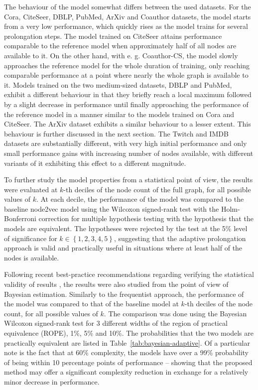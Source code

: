 The behaviour of the model somewhat differs between the used datasets. For the Cora, CiteSeer, DBLP, PubMed, ArXiv and Coauthor datasets, the model starts from a very low performance, which quickly rises as the model trains for several prolongation steps. The model trained on CiteSeer attains performance comparable to the reference model when approximately half of all nodes are available to it. On the other hand, with e. g. Coauthor-CS, the model slowly approaches the reference model for the whole duration of training, only reaching comparable performance at a point where nearly the whole graph is available to it. Models trained on the two medium-sized datasets, DBLP and PubMed, exhibit a different behaviour in that they briefly reach a local maximum followed by a slight decrease in performance until finally approaching the performance of the reference model in a manner similar to the models trained on Cora and CiteSeer. The ArXiv dataset exhibits a similar behaviour to a lesser extent. This behaviour is further discussed in the next section. The Twitch and IMDB datasets are substantially different, with very high initial performance and only small performance gains with increasing number of nodes available, with different variants of it exhibiting this effect to a different magnitude.

To further study the model properties from a statistical point of view, the results were evaluated at \( k \)-th deciles of the node count of the full graph, for all possible values of \( k \). At each decile, the performance of the model was compared to the baseline node2vec model using the Wilcoxon signed-rank test with the Holm-Bonferroni correction for multiple hypothesis testing with the hypothesis that the models are equivalent. The hypotheses were rejected by the test at the 5\% level of significance for \( k \in \left\{ 1, 2, 3, 4, 5 \right\} \), suggesting that the adaptive prolongation approach is valid and practically useful in situations where at least half of the nodes is available.

Following recent best-practice recommendations regarding verifying the statistical validity of results \cite{benavoli_time_2017}, the results were also studied from the point of view of Bayesian estimation. Similarly to the frequentist approach, the performance of the model was compared to that of the baseline model at \( k \)-th deciles of the node count, for all possible values of \( k \). The comparison was done using the Bayesian Wilcoxon signed-rank test \cite{benavoli_bayesian_2014} for 3 different widths of the region of practical equivalence (ROPE), 1\%, 5\% and 10\%. The probabilities that the two models are practically equivalent are listed in Table~\ref{tab:bayesian-adaptive}. Of a particular note is the fact that at 60\% complexity, the models have over a 99\% probability of being within 10 percentage points of performance -- showing that the proposed method may offer a significant complexity reduction in exchange for a relatively minor decrease in performance.


